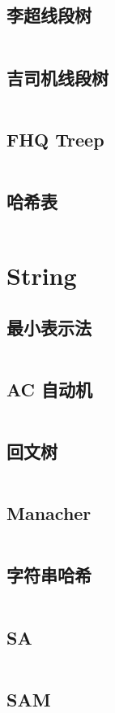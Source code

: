 \documentclass[titlepage, a4paper]{article}
\begin{document}
\begin{multicols}{2}
\begin{spacing}{0.6}
				\subsection{李超线段树}
					\inputminted{cpp}{src/DataStructure/li-chao-tree.cpp}
				\subsection{吉司机线段树}
					\inputminted{cpp}{src/DataStructure/seg-tree.cpp}
				\subsection{FHQ Treep}
					\inputminted{cpp}{src/DataStructure/fhq-treap.cpp}
				\subsection{哈希表}
					\inputminted{cpp}{src/DataStructure/hashmap.cpp}

			\section{String}
				\subsection{最小表示法}
					\inputminted{cpp}{src/String/最小表示法.cpp}
				\subsection{AC 自动机}
					\inputminted{cpp}{src/String/ACAM.cpp}
				\subsection{回文树}
					\inputminted{cpp}{src/String/PAM.cpp}
				\subsection{Manacher}
					\inputminted{cpp}{src/String/Manacher.cpp}
				\subsection{字符串哈希}
					\inputminted{cpp}{src/String/MultipleHash.cpp}
				\subsection{SA}
					\inputminted{cpp}{src/String/SA.cpp}
				\subsection{SAM}
					\inputminted{cpp}{src/String/SAM.cpp}

\end{spacing}
\end{multicols}
\end{document}
